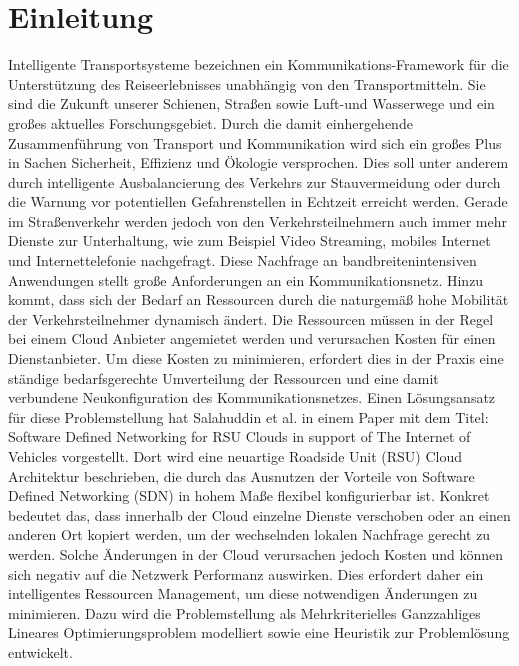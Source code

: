 \documentclass[conference]{IEEEtran}
\begin{document}
\section{Einleitung}

Intelligente Transportsysteme bezeichnen ein Kommunikations-Framework für die Unterstützung des Reiseerlebnisses unabhängig von den Transportmitteln. Sie sind die Zukunft unserer Schienen, Straßen sowie Luft-und Wasserwege und ein großes aktuelles Forschungsgebiet. Durch die damit einhergehende Zusammenführung von Transport und Kommunikation wird sich ein großes Plus in Sachen Sicherheit, Effizienz und Ökologie versprochen. Dies soll unter anderem durch intelligente Ausbalancierung des Verkehrs zur Stauvermeidung oder durch die Warnung vor potentiellen Gefahrenstellen in Echtzeit erreicht werden. Gerade im Straßenverkehr werden jedoch von den Verkehrsteilnehmern auch immer mehr Dienste zur Unterhaltung, wie zum Beispiel Video Streaming, mobiles Internet und Internettelefonie nachgefragt. Diese Nachfrage an bandbreitenintensiven Anwendungen stellt große Anforderungen an ein Kommunikationsnetz. Hinzu kommt, dass sich der Bedarf an Ressourcen durch die naturgemäß hohe Mobilität der Verkehrsteilnehmer dynamisch ändert. Die Ressourcen müssen in der Regel bei einem Cloud Anbieter angemietet werden und verursachen Kosten für einen Dienstanbieter. Um diese Kosten zu minimieren, erfordert dies in der Praxis eine ständige bedarfsgerechte Umverteilung der Ressourcen und eine damit verbundene Neukonfiguration des Kommunikationsnetzes. Einen Lösungsansatz für diese Problemstellung hat Salahuddin et al. in einem Paper \cite{IEEEhowto:orig} mit dem 
Titel: \glqq Software Defined Networking for RSU Clouds in support of The Internet of Vehicles\grqq{} vorgestellt.
Dort wird eine neuartige Roadside Unit (RSU) Cloud Architektur beschrieben, die durch das Ausnutzen der Vorteile von Software Defined Networking (SDN) in hohem Maße flexibel konfigurierbar ist. Konkret bedeutet das, dass innerhalb der Cloud einzelne Dienste verschoben oder an einen anderen Ort kopiert werden, um der wechselnden lokalen Nachfrage gerecht zu werden. Solche Änderungen in der Cloud verursachen jedoch Kosten und können sich negativ auf die Netzwerk Performanz auswirken. Dies erfordert daher ein intelligentes Ressourcen Management, um diese notwendigen Änderungen zu minimieren. Dazu wird die Problemstellung als Mehrkriterielles Ganzzahliges Lineares Optimierungsproblem modelliert sowie eine Heuristik zur Problemlösung entwickelt.\\
\end{document}
